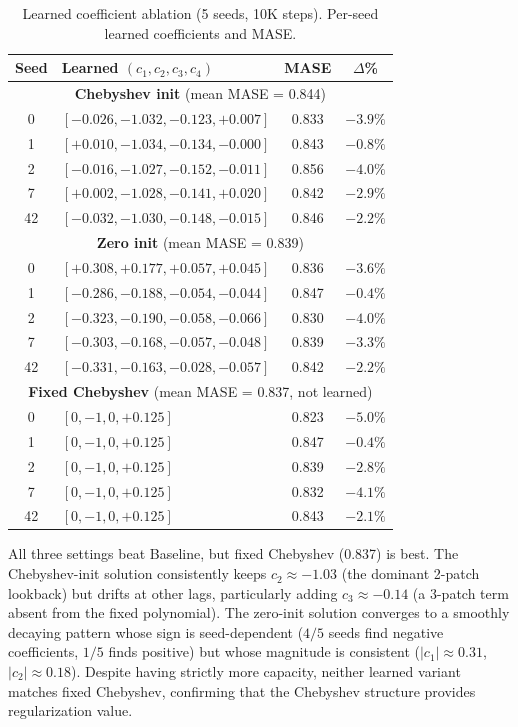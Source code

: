 \documentclass{article}
\begin{document}
\begin{table}[H]
\centering
\caption{Learned coefficient ablation (5 seeds, 10K steps). Per-seed learned coefficients and MASE.}
\small
\begin{tabular}{clcc}
\toprule
\textbf{Seed} & \textbf{Learned $(c_1, c_2, c_3, c_4)$} & \textbf{MASE} & \textbf{$\Delta$\%} \\
\midrule
\multicolumn{4}{c}{\textbf{Chebyshev init} (mean MASE = 0.844)} \\
\midrule
0 & $[-0.026, -1.032, -0.123, +0.007]$ & 0.833 & $-3.9\%$ \\
1 & $[+0.010, -1.034, -0.134, -0.000]$ & 0.843 & $-0.8\%$ \\
2 & $[-0.016, -1.027, -0.152, -0.011]$ & 0.856 & $-4.0\%$ \\
7 & $[+0.002, -1.028, -0.141, +0.020]$ & 0.842 & $-2.9\%$ \\
42 & $[-0.032, -1.030, -0.148, -0.015]$ & 0.846 & $-2.2\%$ \\
\midrule
\multicolumn{4}{c}{\textbf{Zero init} (mean MASE = 0.839)} \\
\midrule
0 & $[+0.308, +0.177, +0.057, +0.045]$ & 0.836 & $-3.6\%$ \\
1 & $[-0.286, -0.188, -0.054, -0.044]$ & 0.847 & $-0.4\%$ \\
2 & $[-0.323, -0.190, -0.058, -0.066]$ & 0.830 & $-4.0\%$ \\
7 & $[-0.303, -0.168, -0.057, -0.048]$ & 0.839 & $-3.3\%$ \\
42 & $[-0.331, -0.163, -0.028, -0.057]$ & 0.842 & $-2.2\%$ \\
\midrule
\multicolumn{4}{c}{\textbf{Fixed Chebyshev} (mean MASE = 0.837, not learned)} \\
\midrule
0 & $[0, -1, 0, +0.125]$ & 0.823 & $-5.0\%$ \\
1 & $[0, -1, 0, +0.125]$ & 0.847 & $-0.4\%$ \\
2 & $[0, -1, 0, +0.125]$ & 0.839 & $-2.8\%$ \\
7 & $[0, -1, 0, +0.125]$ & 0.832 & $-4.1\%$ \\
42 & $[0, -1, 0, +0.125]$ & 0.843 & $-2.1\%$ \\
\bottomrule
\end{tabular}
\end{table}

All three settings beat Baseline, but fixed Chebyshev (0.837) is best. The Chebyshev-init solution consistently keeps $c_2 \approx -1.03$ (the dominant 2-patch lookback) but drifts at other lags, particularly adding $c_3 \approx -0.14$ (a 3-patch term absent from the fixed polynomial). The zero-init solution converges to a smoothly decaying pattern whose sign is seed-dependent ($4/5$ seeds find negative coefficients, $1/5$ finds positive) but whose magnitude is consistent ($|c_1| \approx 0.31$, $|c_2| \approx 0.18$). Despite having strictly more capacity, neither learned variant matches fixed Chebyshev, confirming that the Chebyshev structure provides regularization value.
\end{document}
